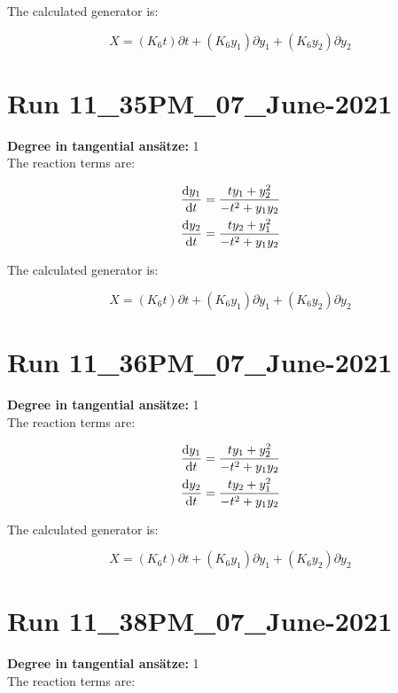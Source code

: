 The calculated generator is:

\begin{equation}X=\left(K_{6} t\right)\partial t+\left(K_{6} y_{1}\right)\partial y_{1}+\left(K_{6} y_{2}\right)\partial y_{2}\end{equation}
\section*{Run 11\_35PM\_07\_June-2021}
\textbf{Degree in tangential ansätze:}	1\\
The reaction terms are:

\begin{align*}
\dv{y_{1}}{t}&=\frac{t y_{1} + y_{2}^{2}}{- t^{2} + y_{1} y_{2}}\\
\dv{y_{2}}{t}&=\frac{t y_{2} + y_{1}^{2}}{- t^{2} + y_{1} y_{2}}\\
\end{align*}

The calculated generator is:

\begin{equation}X=\left(K_{6} t\right)\partial t+\left(K_{6} y_{1}\right)\partial y_{1}+\left(K_{6} y_{2}\right)\partial y_{2}\end{equation}
\section*{Run 11\_36PM\_07\_June-2021}
\textbf{Degree in tangential ansätze:}	1\\
The reaction terms are:

\begin{align*}
\dv{y_{1}}{t}&=\frac{t y_{1} + y_{2}^{2}}{- t^{2} + y_{1} y_{2}}\\
\dv{y_{2}}{t}&=\frac{t y_{2} + y_{1}^{2}}{- t^{2} + y_{1} y_{2}}\\
\end{align*}

The calculated generator is:

\begin{equation}X=\left(K_{6} t\right)\partial t+\left(K_{6} y_{1}\right)\partial y_{1}+\left(K_{6} y_{2}\right)\partial y_{2}\end{equation}
\section*{Run 11\_38PM\_07\_June-2021}
\textbf{Degree in tangential ansätze:}	1\\
The reaction terms are:


